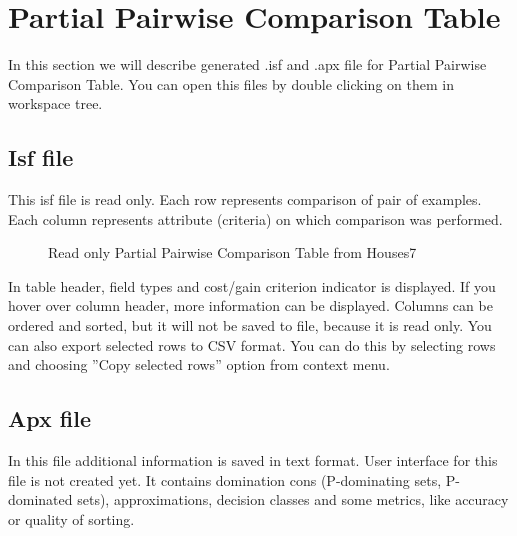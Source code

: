 \section{Partial Pairwise Comparison Table}\label{section:pct}

In this section we will describe generated .isf and .apx file for Partial Pairwise Comparison Table. You can open this files by double clicking on them in workspace tree.

\subsection{Isf file}\label{sub:pct-isf}

This isf file is read only. Each row represents comparison of pair of examples. Each column represents attribute (criteria) on which comparison was performed.

\begin{figure*}[!ht] 
	\centering
	\caption{Read only Partial Pairwise Comparison Table from Houses7}
\end{figure*}

In table header, field types and cost/gain criterion indicator is displayed. If you hover over column header, more information can be displayed. Columns can be ordered and sorted, but it will not be saved to file, because it is read only. You can also export selected rows to CSV format. You can do this by selecting rows and choosing ''Copy selected rows'' option from context menu.

\subsection{Apx file}\label{sub:pct-apx}

In this file additional information is saved in text format. User interface for this file is not created yet. It contains domination cons (P-dominating sets, P-dominated sets), approximations, decision classes and some metrics, like accuracy or quality of sorting.

\vfill\newpage